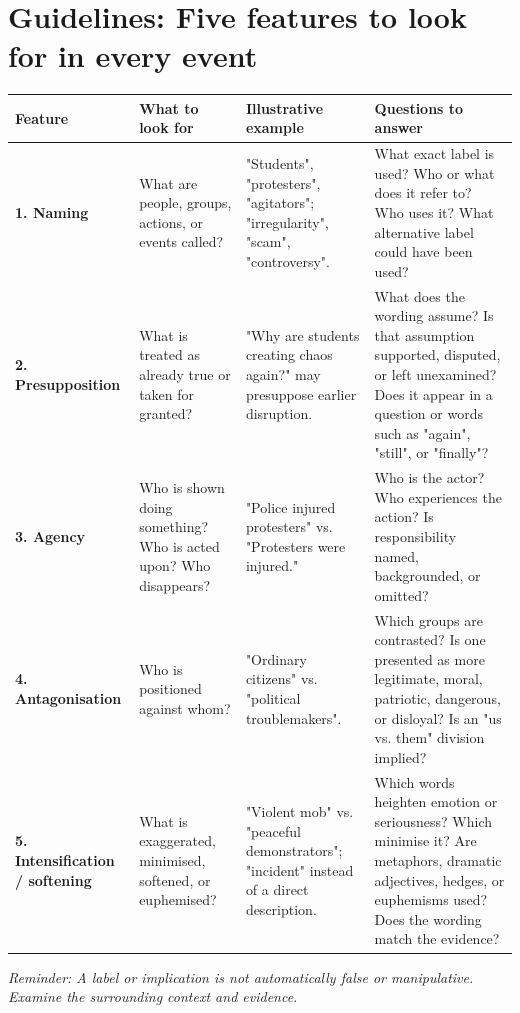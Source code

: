 \documentclass[10pt,a4paper]{article}
\begin{document}
\section*{Guidelines: Five features to look for in every event}
\begin{longtable}{@{}>{\raggedright\arraybackslash}p{} >{\raggedright\arraybackslash}p{} >{\raggedright\arraybackslash}p{} >{\raggedright\arraybackslash}p{}@{}}
\toprule
\textbf{Feature} & \textbf{What to look for} & \textbf{Illustrative example} & \textbf{Questions to answer} \\
\midrule
\endhead
\textbf{1. Naming} & What are people, groups, actions, or events called? & "Students", "protesters", "agitators"; "irregularity", "scam", "controversy". & What exact label is used? Who or what does it refer to? Who uses it? What alternative label could have been used? \\
\addlinespace[4pt]
\textbf{2. Presupposition} & What is treated as already true or taken for granted? & "Why are students creating chaos again?" may presuppose earlier disruption. & What does the wording assume? Is that assumption supported, disputed, or left unexamined? Does it appear in a question or words such as "again", "still", or "finally"? \\
\addlinespace[4pt]
\textbf{3. Agency} & Who is shown doing something? Who is acted upon? Who disappears? & "Police injured protesters" vs. "Protesters were injured." & Who is the actor? Who experiences the action? Is responsibility named, backgrounded, or omitted? \\
\addlinespace[4pt]
\textbf{4. Antagonisation} & Who is positioned against whom? & "Ordinary citizens" vs. "political troublemakers". & Which groups are contrasted? Is one presented as more legitimate, moral, patriotic, dangerous, or disloyal? Is an "us vs. them" division implied? \\
\addlinespace[4pt]
\textbf{5. Intensification / softening} & What is exaggerated, minimised, softened, or euphemised? & "Violent mob" vs. "peaceful demonstrators"; "incident" instead of a direct description. & Which words heighten emotion or seriousness? Which minimise it? Are metaphors, dramatic adjectives, hedges, or euphemisms used? Does the wording match the evidence? \\
\bottomrule
\end{longtable}
\textit{Reminder: A label or implication is not automatically false or manipulative. Examine the surrounding context and evidence.}
\end{document}
